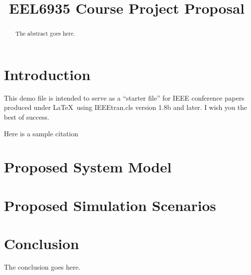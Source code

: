 \documentclass[conference]{IEEEtran}
\begin{document}
\title{EEL6935 Course Project Proposal}
\author{
}

\maketitle

\begin{abstract}
    The abstract goes here.
\end{abstract}

\IEEEpeerreviewmaketitle

\section{Introduction}
    This demo file is intended to serve as a ``starter file''
    for IEEE conference papers produced under \LaTeX\ using
    IEEEtran.cls version 1.8b and later.
    I wish you the best of success.

    Here is a sample citation \cite{young2017recent}

\section{Proposed System Model}

\section{Proposed Simulation Scenarios}

\section{Conclusion}
The conclusion goes here.



\end{document}
